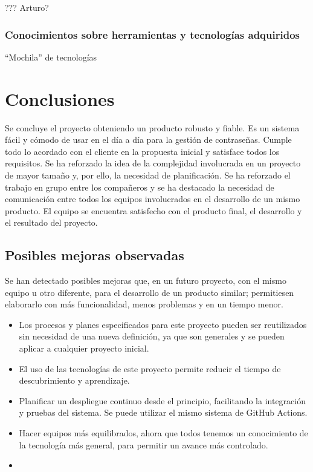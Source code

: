 \documentclass{article}
\begin{document}
??? Arturo?

\subsubsection*{Conocimientos sobre herramientas y tecnologías adquiridos}

``Mochila'' de tecnologías

\pagebreak

\section*{Conclusiones}

Se concluye el proyecto obteniendo un producto robusto y fiable. Es un sistema fácil y cómodo de usar en el día a día para la gestión de contraseñas. Cumple todo lo acordado con el cliente en la propuesta inicial y satisface todos los requisitos. Se ha reforzado la idea de la complejidad involucrada en un proyecto de mayor tamaño y, por ello, la necesidad de planificación. Se ha reforzado el trabajo en grupo entre los compañeros y se ha destacado la necesidad de comunicación entre todos los equipos involucrados en el desarrollo de un mismo producto. El equipo se encuentra satisfecho con el producto final, el desarrollo y el resultado del proyecto.

\subsection*{Posibles mejoras observadas}

Se han detectado posibles mejoras que, en un futuro proyecto, con el mismo equipo u otro diferente, para el desarrollo de un producto similar; permitiesen elaborarlo con más funcionalidad, menos problemas y en un tiempo menor.

\begin{itemize}
   \setlength\itemsep{0em}
   \item Los procesos y planes especificados para este proyecto pueden ser reutilizados sin necesidad de una nueva definición, ya que son generales y se pueden aplicar a cualquier proyecto inicial.
   \item El uso de las tecnologías de este proyecto permite reducir el tiempo de descubrimiento y aprendizaje.
   \item Planificar un despliegue continuo desde el principio, facilitando la integración y pruebas del sistema. Se puede utilizar el mismo sistema de GitHub Actions.
   \item Hacer equipos más equilibrados, ahora que todos tenemos un conocimiento de la tecnología más general, para permitir un avance más controlado.
   \item 
\end{itemize}
\end{document}

